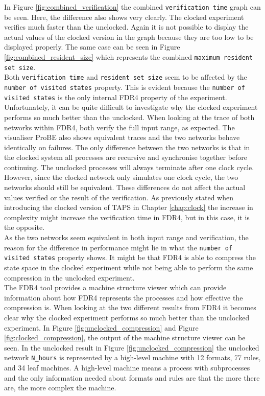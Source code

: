 In Figure \ref{fig:combined_verification} the combined \texttt{verification time} graph can be seen. Here, the difference also shows very clearly. The clocked experiment verifies much faster than the unclocked. Again it is not possible to display the actual values of the clocked version in the graph because they are too low to be displayed properly. The same case can be seen in Figure \ref{fig:combined_resident_size} which represents the combined \texttt{maximum resident set size}. \\

Both \texttt{verification time} and \texttt{resident set size} seem to be affected by the \texttt{number of visited states} property. This is evident because the
\texttt{number of visited states} is the only internal FDR4 property of the experiment. Unfortunately, it can be quite difficult to investigate why the clocked experiment performs so much better than the unclocked. When looking at the trace of both networks within FDR4, both verify the full input range, as expected. The visualiser ProBE also shows equivalent traces and the two networks behave identically on failures. The only difference between the two networks is that in the clocked system all processes are recursive and synchronise together before continuing. The unclocked processes will always terminate after one clock cycle. However, since the clocked network only simulates one clock cycle, the two networks should still be equivalent. These differences do not affect the actual values verified or the result of the verification. As previously stated when introducing the clocked version of TAPS in Chapter \ref{chap:clock} the increase in complexity might increase the verification time in FDR4, but in this case, it is the opposite. \\

As the two networks seem equivalent in both input range and verification, the reason for the difference in performance might lie in what the \texttt{number of visited states} property shows. It might be that FDR4 is able to compress the state space in the clocked experiment while not being able to perform the same compression in the unclocked experiment. \\

The FDR4 tool provides a machine structure viewer which can provide information about how FDR4 represents the processes and how effective the compression is. When looking at the two different results from FDR4 it becomes clear why the clocked experiment performs so much better than the unclocked experiment. In Figure \ref{fig:unclocked_compression} and Figure \ref{fig:clocked_compression}, the output of the machine structure viewer can be seen. In the unclocked result in Figure \ref{fig:unclocked_compression} the unclocked network
\texttt{N\_hours} is represented by a high-level machine with 12 formats, 77 rules, and 34 leaf machines. A high-level machine means a process with subprocesses and the only information needed about formats and rules are that the more there are, the more complex the machine. \\

